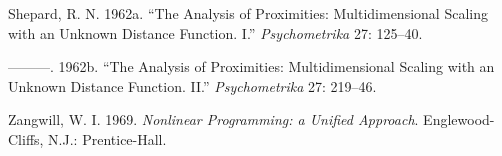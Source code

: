 \documentclass[
  12pt,
]{article}
\newlength{\cslhangindent}
\newenvironment{CSLReferences}[2] %
 {\begin{list}{}{%
  \setlength{\itemindent}{0pt}
  \setlength{\leftmargin}{0pt}
  \setlength{\parsep}{0pt}
  \ifodd #1
   \setlength{\leftmargin}{\cslhangindent}
   \setlength{\itemindent}{-1\cslhangindent}
  \fi
  \setlength{\itemsep}{#2\baselineskip}}}
 {\end{list}}
\begin{document}
\begin{CSLReferences}{1}{0}
Shepard, R. N. 1962a. {``{The Analysis of Proximities: Multidimensional
Scaling with an Unknown Distance Function. I}.''} \emph{Psychometrika}
27: 125--40.

---------. 1962b. {``{The Analysis of Proximities: Multidimensional
Scaling with an Unknown Distance Function. II}.''} \emph{Psychometrika}
27: 219--46.

Zangwill, W. I. 1969. \emph{{Nonlinear Programming: a Unified
Approach}}. Englewood-Cliffs, N.J.: Prentice-Hall.

\end{CSLReferences}
\end{document}
